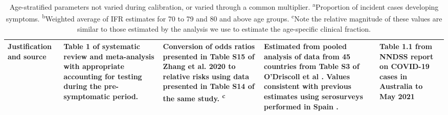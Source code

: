 \begin{table}[h]
\begin{tabular}[h]{| p{2cm} | p{2.5cm} | p{3cm} | p{3cm} | p{2.5cm}|}
        \hline
        Justification and source & 
        Table 1 of systematic review and meta-analysis with appropriate accounting for testing during the pre-symptomatic period. & 
        Conversion of odds ratios presented in Table S15 of Zhang et al. 2020 to relative risks using data presented in Table S14 of the same study. \textsuperscript{c} &
        Estimated from pooled analysis of data from 45 countries from Table S3 of O'Driscoll et al \cite{odriscoll-2021}. 
        Values consistent with previous estimates using serosurveys performed in Spain \cite{RN21}. &
        Table 1.1 from NNDSS report on COVID-19 cases in Australia to May 2021 \\ 
        \hline
	\end{tabular}
	\caption[Age-stratified parameters not varied during calibration, or varied through a common multiplier.]
    {Age-stratified parameters not varied during calibration, or varied through a common multiplier. 
    \textsuperscript{a}Proportion of incident cases developing symptoms.
    \textsuperscript{b}Weighted average of IFR estimates for 70 to 79 and 80 and above age groups. 
    \textsuperscript{c}Note the relative magnitude of these values are similar to those estimated by the analysis we use to estimate the age-specific clinical fraction.}
	\label{tab:age_params}
\end{table}

\clearpage